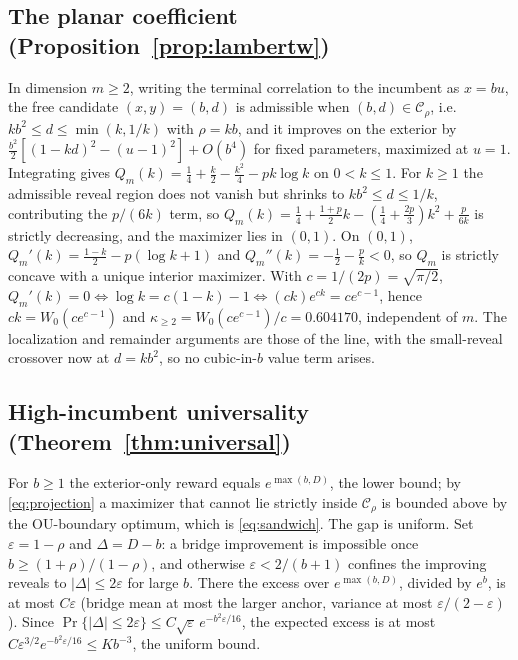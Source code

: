 \documentclass[11pt]{article}
\theoremstyle{itheads}
\begin{document}
\subsection*{The planar coefficient (Proposition~\ref{prop:lambertw})}

In dimension $m\ge2$, writing the terminal correlation to the incumbent
as $x=bu$, the free candidate $(x,y)=(b,d)$ is admissible when
$(b,d)\in\mathcal{C}_\rho$, i.e.\ $kb^{2}\le d\le\min(k,1/k)$ with
$\rho=kb$, and it improves on the exterior by
$\tfrac{b^{2}}{2}[(1-kd)^{2}-(u-1)^{2}]+O(b^{4})$ for fixed parameters,
maximized at $u=1$. Integrating
gives $Q_m(k)=\tfrac14+\tfrac{k}{2}-\tfrac{k^{2}}{4}-pk\log k$ on
$0<k\le1$. For $k\ge1$ the admissible reveal region does not vanish but
shrinks to $kb^{2}\le d\le1/k$, contributing the $p/(6k)$ term, so
$Q_m(k)=\tfrac14+\tfrac{1+p}{2}k-(\tfrac14+\tfrac{2p}{3})k^{2}+\tfrac{p}{6k}$
is strictly decreasing, and the maximizer lies in $(0,1)$. On
$(0,1)$, $Q_m'(k)=\tfrac{1-k}{2}-p(\log k+1)$ and
$Q_m''(k)=-\tfrac12-\tfrac{p}{k}<0$, so $Q_m$ is strictly concave with a
unique interior maximizer. With $c=1/(2p)=\sqrt{\pi/2}$,
$Q_m'(k)=0\iff\log k=c(1-k)-1\iff(ck)e^{ck}=ce^{c-1}$, hence
$ck=W_0(ce^{c-1})$ and $\kappa_{\ge2}=W_0(ce^{c-1})/c=0.604170$,
independent of $m$. The localization and remainder arguments are those
of the line, with the small-reveal crossover now at $d=kb^{2}$, so no
cubic-in-$b$ value term arises.

\subsection*{High-incumbent universality (Theorem~\ref{thm:universal})}

For $b\ge1$ the exterior-only reward equals $e^{\max(b,D)}$, the lower
bound; by \eqref{eq:projection} a maximizer that cannot lie strictly
inside $\mathcal{C}_\rho$ is bounded above by the OU-boundary optimum,
which is \eqref{eq:sandwich}. The gap is uniform. Set
$\varepsilon=1-\rho$ and $\Delta=D-b$: a bridge improvement is
impossible once $b\ge(1+\rho)/(1-\rho)$, and otherwise
$\varepsilon<2/(b+1)$ confines the improving reveals to
$|\Delta|\le2\varepsilon$ for large $b$. There the excess over
$e^{\max(b,D)}$, divided by $e^{b}$, is at most $C\varepsilon$ (bridge
mean at most the larger anchor, variance at most
$\varepsilon/(2-\varepsilon)$). Since
$\Pr\{|\Delta|\le2\varepsilon\}\le C\sqrt{\varepsilon}\,
e^{-b^{2}\varepsilon/16}$, the expected excess is at most
$C\varepsilon^{3/2}e^{-b^{2}\varepsilon/16}\le Kb^{-3}$, the uniform
bound.
\end{document}
